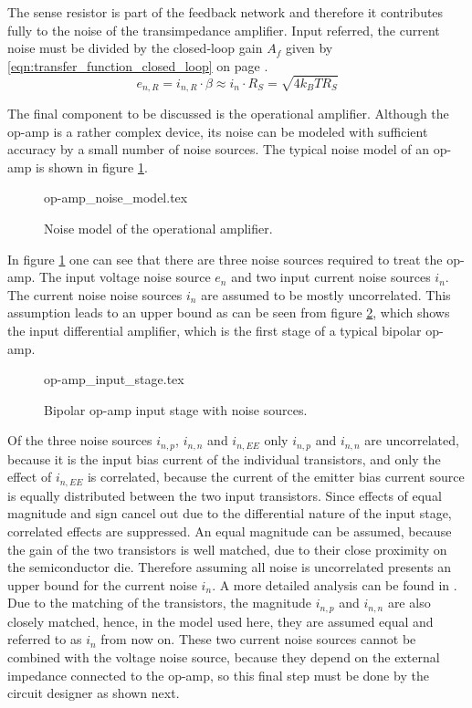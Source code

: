 The sense resistor is part of the feedback network and therefore it contributes fully to the noise of the transimpedance amplifier. Input referred, the current noise must be divided by the closed-loop gain $A_f$ given by \ref{eqn:transfer_function_closed_loop} on page \pageref{eqn:transfer_function_closed_loop}.
\begin{equation}
    e_{n,R} = i_{n,R} \cdot \beta \approx i_n \cdot R_S = \sqrt{4 k_B T R_S} \label{eqn:noise_sense_resistor}
\end{equation}

The final component to be discussed is the operational amplifier. Although the op-amp is a rather complex device, its noise can be modeled with sufficient accuracy by a small number of noise sources. The typical noise model of an op-amp is shown in figure \ref{fig:op-amp_noise_model}.
\begin{figure}[ht]
    \centering
        {op-amp_noise_model.tex}
    \caption{Noise model of the operational amplifier.}
    \label{fig:op-amp_noise_model}
\end{figure}

In figure \ref{fig:op-amp_noise_model} one can see that there are three noise sources required to treat the op-amp. The input voltage noise source $e_{n}$ and two input current noise sources $i_n$. The current noise noise sources $i_n$ are assumed to be mostly uncorrelated. This assumption leads to an upper bound as can be seen from figure \ref{fig:op-amp_input_stage}, which shows the input differential amplifier, which is the first stage of a typical bipolar op-amp.
\begin{figure}[hb]
    \centering
        {op-amp_input_stage.tex}
    \caption{Bipolar op-amp input stage with noise sources.}
    \label{fig:op-amp_input_stage}
\end{figure}

Of the three noise sources $i_{n,p}$, $i_{n,n}$ and $i_{n,EE}$ only $i_{n,p}$ and $i_{n,n}$ are uncorrelated, because it is the input bias current of the individual transistors, and only the effect of $i_{n,EE}$ is correlated, because the current of the emitter bias current source is equally distributed between the two input transistors. Since effects of equal magnitude and sign cancel out due to the differential nature of the input stage, correlated effects are suppressed. An equal magnitude can be assumed, because the gain of the two transistors is well matched, due to their close proximity on the semiconductor die. Therefore assuming all noise is uncorrelated presents an upper bound for the current noise $i_n$. A more detailed analysis can be found in \cite{op-amp_noise_correlation}. Due to the matching of the transistors, the magnitude $i_{n,p}$ and $i_{n,n}$ are also closely matched, hence, in the model used here, they are assumed equal and referred to as $i_n$ from now on. These two current noise sources cannot be combined with the voltage noise source, because they depend on the external impedance connected to the op-amp, so this final step must be done by the circuit designer as shown next.

